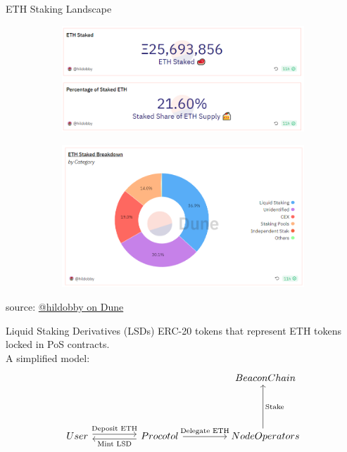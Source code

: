 \documentclass{beamer}
\begin{document}
\begin{frame}{ETH Staking Landscape}
    \begin{figure}
        \centering
        \begin{subfigure}[b]{0.45\textwidth}
            \centering
            \includegraphics[width=\textwidth]{figures/eth_stake_stats.png}
        \end{subfigure}
        \begin{subfigure}[b]{0.45\textwidth}
            \centering
            \includegraphics[width=\textwidth]{figures/eth_stake_breakdown.png}
        \end{subfigure}
    \end{figure}
    \tiny{source: \href{https://dune.com/hildobby/eth2-staking}{@hildobby on Dune}}

\end{frame}

\begin{frame}{Liquid Staking Derivatives (LSDs)}
    ERC-20 tokens that represent ETH tokens locked in PoS contracts. \\
    A simplified model:
    \[
\begin{tikzcd}[ampersand replacement=\&, column sep = 4.5em, row sep = 4.5em]
    \& \& Beacon Chain 
    \\
    User \arrow[r, shift left, "\text{Deposit ETH}" ]
    \arrow[r,leftarrow, shift right, "\text{Mint LSD}" '] 
    \& Procotol \arrow[r, "\text{Delegate ETH}"]
    \& Node Operators \arrow[u, shift left, "\text{Stake}" ']
\end{tikzcd}
\]
    

\end{frame}
\end{document}
